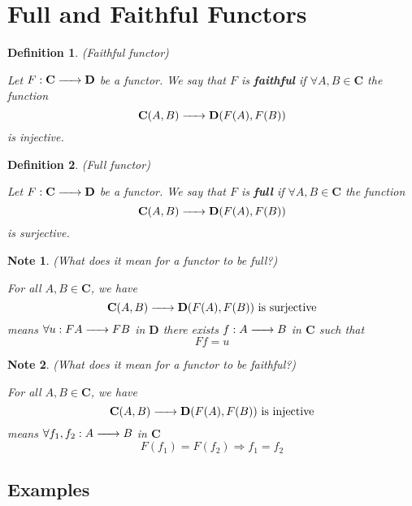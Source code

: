 \documentclass{article}
\newtheorem{definition}{Definition}[section]
\newtheorem{note}{Note}[section]
\renewcommand{\to}{\xrightarrow{\hspace{0.5cm}}}  %
\begin{document}
    \section{Full and Faithful Functors}

    \begin{definition} (Faithful functor)

        Let \(F: \mathbf{C} \to \mathbf{D}\) be a functor. We say that \(F\) is \textbf{faithful} if \(\forall A, B \in \mathbf{C}\) the function
        \[
            \mathbf{C}(A, B) \to \mathbf{D}(F(A), F(B))
        \]
        is injective.

    \end{definition}

    \begin{definition} (Full functor)

        Let \(F: \mathbf{C} \to \mathbf{D}\) be a functor. We say that \(F\) is \textbf{full} if \(\forall A, B \in \mathbf{C}\) the function
        \[
            \mathbf{C}(A, B) \to \mathbf{D}(F(A), F(B))
        \]
        is surjective.
    \end{definition}

    \begin{note} (What does it mean for a functor to be full?)

        For all \(A, B \in \mathbf{C}\), we have
        \[
            \mathbf{C}(A, B) \to \mathbf{D}(F(A), F(B)) \text{ is surjective}
        \]
        means \(\forall u: FA \to FB\) in \(\mathbf{D}\) there exists \(f: A \to B\) in \(\mathbf{C}\) such that
        \[
            Ff = u
        \]

    \end{note}

    \begin{note} (What does it mean for a functor to be faithful?)

        For all \(A, B \in \mathbf{C}\), we have
        \[
            \mathbf{C}(A, B) \to \mathbf{D}(F(A), F(B)) \text{ is injective}
        \]
        means \(\forall f_1, f_2: A \to B\) in \(\mathbf{C}\)
        \[
            F(f_1) = F(f_2) \Rightarrow f_1 = f_2
        \]
    \end{note}

    \subsection{Examples}
\end{document}
